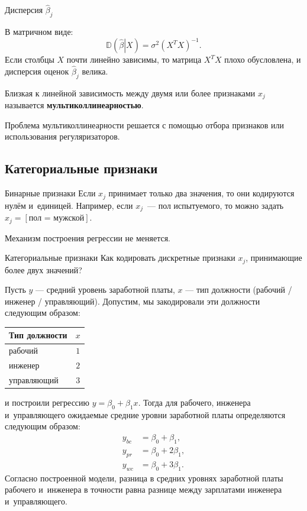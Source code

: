 \documentclass[9pt,pdf,utf8,hyperref={unicode},aspectratio=169]{beamer}
\begin{document}
\begin{frame}{Дисперсия $\hat{\beta}_j$}
{    \bigskip
    	
    В матричном виде:
    $$\mathbb{D}\left(\left.\hat{\beta}\right|X\right) = \sigma^2\left(X^TX\right)^{-1}.$$
    Если столбцы $X$ почти линейно зависимы, то матрица $X^TX$ плохо обусловлена, и дисперсия оценок $\hat{\beta}_j$ велика.

    \bigskip

    Близкая к линейной зависимость между двумя или более признаками $x_j$ называется \textbf{мультиколлинеарностью}.
    
    Проблема мультиколлинеарности решается с помощью отбора признаков или использования регуляризаторов.
    }
\end{frame}

\subsection{Категориальные признаки}
\begin{frame}{Бинарные признаки}
	Если $x_j$ принимает только два значения, то они кодируются нулём и~единицей. Например, если $x_j$~--- пол испытуемого, то можно задать $x_j = \left[\text{пол = мужской}\right].$
	
	\bigskip
	
	Механизм построения регрессии не меняется.
\end{frame}

\begin{frame}{Категориальные признаки}
	Как кодировать дискретные признаки $x_j$, принимающие более двух значений?
	
	Пусть $y$ --- средний уровень заработной платы, $x$ --- тип должности (рабочий / инженер / управляющий).
	Допустим, мы закодировали эти должности следующим образом:
	\begin{center}
		\begin{tabular}{|l|c|} \hline
			Тип должности & $x$ \\\hline
			рабочий       & $1$ \\
			инженер       & $2$ \\
			управляющий   & $3$ \\\hline
		\end{tabular}
	\end{center}
	и построили регрессию $y=\beta_0+\beta_1x$. Тогда для рабочего, инженера и~управляющего ожидаемые средние уровни заработной платы определяются следующим образом:
	\begin{align*}
	y_{bc} &= \beta_0 + \beta_1, \\
	y_{pr} &= \beta_0 + 2\beta_1, \\
	y_{wc} &= \beta_0 + 3\beta_1.
	\end{align*}
	Согласно построенной модели, разница в средних уровнях заработной платы рабочего и~инженера в точности равна разнице между зарплатами инженера и~управляющего.
\end{frame}
\end{document}
